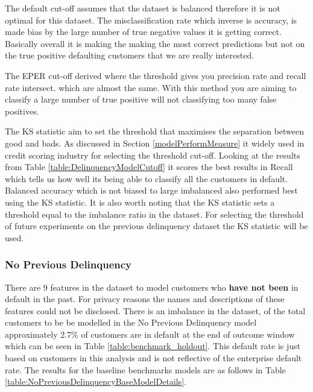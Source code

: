 The default cut-off assumes that the dataset is balanced therefore it is not optimal for this dataset. The misclassification rate which inverse is accuracy, is made bias by the large number of true negative values it is getting correct. Basically overall it is making the making the most correct predictions but not on the true positive defaulting customers that we are really interested. 

The EPER cut-off derived where the threshold gives you precision rate and recall rate intersect. which are almost the same. With this method you are aiming to classify a large number of true positive will not classifying too many false positives. 

The KS statistic aim to set the threshold that maximises the separation between good and bads. As discussed in Section \ref{modelPerformMeasure} it widely used in credit scoring industry for selecting the threshold cut-off. Looking at the results from Table \ref{table:DelinquencyModelCutoff} it scores the best results in Recall which tells us how well its being able to classify all the customers in default. Balanced accuracy which is not biased to large imbalanced also performed best using the KS statistic. It is also worth noting that the KS statistic sets a threshold equal to the imbalance ratio in the dataset. For selecting the threshold of future experiments on the previous delinquency dataset the KS statistic will be used. 



\subsubsection{No Previous Delinquency}

There are 9 features in the dataset to model customers who \textbf{have not been} in default in the past. For privacy reasons the names and descriptions of these features could not be disclosed. There is an imbalance in the dataset, of the total customers to be be modelled in the No Previous Delinquency model approximately 2.7\% of customers are in default at the end of outcome window which can be seen in Table \ref{table:benchmark_holdout}. This default rate is just based on customers in this analysis and is not reflective of the enterprise default rate. The results for the baseline benchmarks models are as follows in Table \ref{table:NoPreviousDelinquencyBaseModelDetails}.

